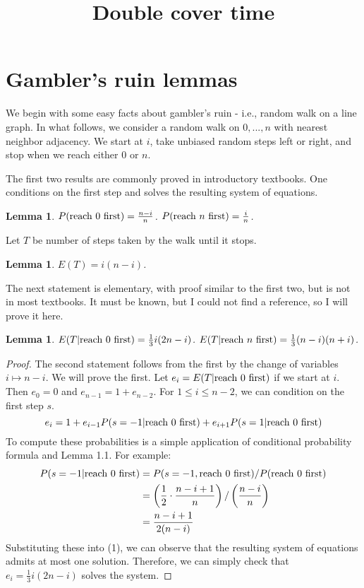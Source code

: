 \documentclass[12pt]{amsart}
\title{Double cover time}
\theoremstyle{plain}
\newtheorem{lemma}[theorem]{Lemma}
\theoremstyle{definition}
\theoremstyle{remark}
\begin{document}
\maketitle
\section{Gambler's ruin lemmas}
We begin with some easy facts about gambler's ruin - i.e., random walk on a line graph.
In what follows, we consider a random walk on ${0, ..., n}$ with nearest neighbor adjacency.
We start at $i$, take unbiased random steps left or right, and stop when we reach either $0$ or $n$.

The first two results are commonly proved in introductory textbooks.
One conditions on the first step and solves the resulting system of equations.

\begin{lemma}
$P(\textup{reach 0 first}) = \frac{n-i}{n}$.
$P(\textup{reach $n$ first}) = \frac{i}{n}$.
\end{lemma}

Let $T$ be number of steps taken by the walk until it stops.

\begin{lemma}
$E(T) = i(n-i)$.
\end{lemma}

The next statement is elementary, with proof similar to the first two, but is not in most textbooks.
It must be known, but I could not find a reference, so I will prove it here.

\begin{lemma}
$E(T|\textup{reach 0 first}) = \frac{1}{3}i(2n-i)$.
$E(T|\textup{reach $n$ first}) = \frac{1}{3}(n-i)(n+i)$.
\end{lemma}
\begin{proof}
The second statement follows from the first by the change of variables $i \mapsto n-i$.
We will prove the first.
Let $e_i = E(T|\textup{reach 0 first})$ if we start at $i$.
Then $e_0 = 0$ and $e_{n-1} = 1 + e_{n-2}$.
For $1 \le i \le n-2$, we can condition on the first step $s$.
\begin{equation}
e_i = 1 + e_{i-1}P(s=-1|\textup{reach 0 first}) + e_{i+1}P(s=1|\textup{reach 0 first})
\end{equation}
To compute these probabilities is a simple application of conditional probability formula and Lemma 1.1.
For example:
\begin{align*}
P(s=-1|\textup{reach 0 first}) &= P(s=-1,\textup{reach 0 first}) / P(\textup{reach 0 first}) \\
&= \left(\frac{1}{2} \cdot \frac{n-i+1}{n}\right)/\left(\frac{n-i}{n}\right) \\
&= \frac{n-i+1}{2(n-i)}
\end{align*}
Substituting these into (1), we can observe that the resulting system of equations admits at most one solution.
Therefore, we can simply check that $e_i = \frac{1}{3}i(2n-i)$ solves the system.
\end{proof}
\end{document}
